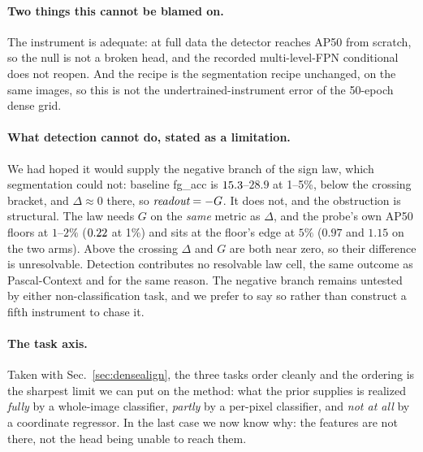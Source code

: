 \paragraph{Two things this cannot be blamed on.} The instrument is adequate: at
full data the detector reaches \detFullAPnone{} AP50 from scratch, so the null
is not a broken head, and the recorded multi-level-FPN conditional does not
reopen. And the recipe is the
segmentation recipe unchanged, on the same images, so this is not the
undertrained-instrument error of the 50-epoch dense grid.

\paragraph{What detection cannot do, stated as a limitation.} We had hoped it
would supply the negative branch of the sign law, which segmentation could not:
baseline fg\_acc is $15.3$--$28.9$ at 1--5\%, below the crossing
bracket, and $\Delta \approx 0$ there, so $\textit{readout} = -G$. It does not,
and the obstruction is structural. The law needs $G$ on the \emph{same} metric
as $\Delta$, and the probe's own AP50 floors at $1$--$2\%$ ($0.22$ at 1\%) and
sits at the floor's edge at $5\%$ ($0.97$ and $1.15$ on the two arms). Above the crossing $\Delta$ and $G$ are both near
zero, so their difference is unresolvable. Detection contributes no resolvable
law cell, the same outcome as Pascal-Context and for the same reason. The
negative branch remains untested by either non-classification task, and we
prefer to say so rather than construct a fifth instrument to chase it.

\paragraph{The task axis.} Taken with Sec.~\ref{sec:densealign}, the three
tasks order cleanly and the ordering is the sharpest limit we can put on the
method: what the prior supplies is realized \emph{fully} by a whole-image
classifier, \emph{partly} by a per-pixel classifier, and \emph{not at all} by a
coordinate regressor. In the last case we now know why: the features are not
there, not the head being unable to reach them.
